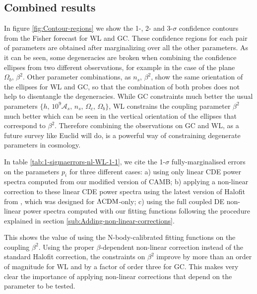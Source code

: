 \subsection{Combined results}

In figure \ref{fig:Contour-regions} we show the 1-, 2- and 3-$\sigma$
confidence contours from the Fisher forecast for WL and GC. These
confidence regions for each pair of parameters are obtained after
marginalizing over all the other parameters. As it can be seen, some
degeneracies are broken when combining the confidence ellipses from
two different observations, for example in the case of the plane $\Omega_{b},\,\beta^{2}$.
Other parameter combinations, as $n_{s},\,\beta^{2}$, show the same
orientation of the ellipses for WL and GC, so that the combination
of both probes does not help to disentangle the degeneracies. While
GC constraints much better the usual parameters $\{h,\,10^{9}\mathcal{A}_{s},\, n_{s},\,\Omega_{c},\,\Omega_{b}\}$,
WL constrains the coupling parameter $\beta^{2}$ much better which
can be seen in the vertical orientation of the ellipses that correspond
to $\beta^{2}$. Therefore combining the observations on GC and WL,
as a future survey like Euclid will do, is a powerful way of constraining
degenerate parameters in cosmology.

In table \ref{tab:1-sigmaerrors-nl-WL-1-1}, we cite the 1-$\sigma$
fully-marginalised errors on the parameters $p_{i}$ for three different
cases: a) using only linear CDE power spectra computed from our modified
version of CAMB; b) applying a non-linear correction to these linear
CDE power spectra using the latest version of Halofit from \cite{takahashi_revising_2012},
which was designed for $\Lambda\mathrm{CDM}$-only; c) using the full coupled DE
non-linear power spectra computed with our fitting functions following
the procedure explained in section \ref{sub:Adding-non-linear-corrections}.

This shows the value of using the N-body-calibrated fitting functions
on the coupling $\beta^{2}$. Using the proper $\beta$-dependent
non-linear correction instead of the standard Halofit correction,
the constraints on $\beta^{2}$ improve by more than an order of magnitude
for WL and by a factor of order three for GC. This makes very clear
the importance of applying non-linear corrections that depend on the
parameter to be tested.

